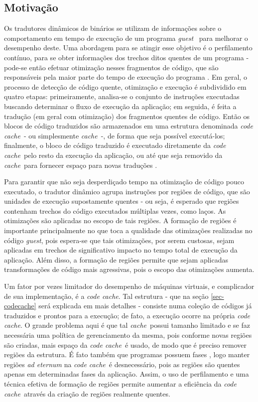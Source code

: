 \documentclass[12pt,twoside]{article}
\newcommand{\ccache}{\emph{code cache}}
\newcommand{\cache}{\emph{cache}}
\newcommand{\guest}{\emph{guest}}
\begin{document}
\subsection{Motivação}
Os tradutores dinâmicos de binários se utilizam de informações sobre o comportamento em tempo de execução de um programa \guest~ para melhorar o desempenho deste. Uma abordagem para se atingir esse objetivo é o perfilamento contínuo, para se obter informações dos trechos ditos quentes de um programa - pode-se então efetuar otimização nesses fragmentos de código, que são responsáveis pela maior parte do tempo de execução do programa \cite{guido-2012}. Em geral, o processo de detecção de código quente, otimização e execução é subdividido em quatro etapas: primeiramente, analisa-se o conjunto de instruções executadas buscando determinar o fluxo de execução da aplicação; em seguida, é feita a tradução (em geral com otimização) dos fragmentos quentes de código. Então os blocos de código traduzidos são armazenados em uma estrutura denominada \ccache~- ou simplesmente \cache~-, de forma que seja possível executá-los;  finalmente, o bloco de código traduzido é executado diretamente da \ccache~pelo resto da execução da aplicação, ou até que seja removido da \cache~para fornecer espaço para novas traduções \cite{kim-2004}.

Para garantir que não seja desperdiçado tempo na otimização de código pouco executado, o tradutor dinâmico agrupa instruções por regiões de código, que são unidades de execução supostamente quentes - ou seja, é esperado que regiões contenham trechos do código executados múltiplas vezes, como laços. As otimizações são aplicadas no escopo de tais regiões. A formação de regiões é importante principalmente no que toca a qualidade das otimizações realizadas no código \guest, pois espera-se que tais otimizações, por serem custosas, sejam aplicadas em trechos de significativo impacto no tempo total de execução da aplicação. Além disso, a formação de regiões permite que sejam aplicadas transformações de código mais agressivas, pois o escopo das otimizações aumenta.

Um fator por vezes limitador do desempenho de máquinas virtuais, e complicador de sua implementação, é a \ccache. Tal estrutura - que na seção \ref{sec-codecache} será explicada em mais detalhes - consiste numa coleção de códigos já traduzidos e prontos para a execução; de fato, a execução ocorre na própria \ccache. O grande problema aqui é que tal \cache~possui tamanho limitado e se faz necessária uma política de gerenciamento da mesma, pois conforme novas regiões são criadas, mais espaço da \ccache~é usado, de modo que é preciso remover regiões da estrutura. É fato também que programas possuem fases \cite{program-phases}, logo manter regiões \emph{ad eternum} na \ccache~é desnecessário, pois as regiões são quentes apenas em determinadas fases da aplicação. Assim, o uso de perfilamento e uma técnica efetiva de formação de regiões permite aumentar a eficiência da \ccache~através da criação de regiões realmente quentes.
\end{document}
